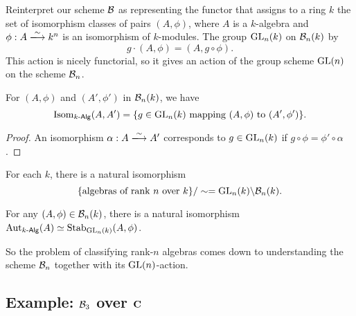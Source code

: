 Reinterpret our scheme $\mathcal{B}$ as representing the functor that assigns to a ring 
$k$ the set of isomorphism classes of pairs $(A,\phi)$, where $A$ is a 
$k$-algebra and $\phi:A\iso k^n$ is an isomorphism of $k$-modules. The group 
$\operatorname{GL}_n(k)$ on $\mathcal{B}_n(k)$ by 
\[
  g\cdot (A,\phi) = (A,g\circ \phi) .
\]
This action is nicely functorial, so it gives an action of the group scheme 
$\operatorname{GL}(n)$ on the scheme $\mathcal{B}_n$. 

\begin{prop}
For $(A,\phi)$ and $(A',\phi')$ in $\mathcal{B}_n(k)$, we have 
\[
  \operatorname{Isom}_{k\text{-}\mathsf{Alg}}(A,A') = \{g\in \operatorname{GL}_n(k)\text{ mapping }(A,\phi)\text{ to }(A',\phi')\} .
\]
\end{prop}
\begin{proof}
An isomorphism $\alpha:A\iso A'$ corresponds to $g\in \operatorname{GL}_n(k)$ if  
$g\circ\phi = \phi'\circ \alpha$. 
\end{proof}

\begin{coro}
For each $k$, there is a natural isomorphism 
\[
  \{\text{algebras of rank $n$ over $k$}\}/\sim = \operatorname{GL}_n(k)\backslash \mathcal{B}_n(k) . 
\]
\end{coro}

\begin{coro}
For any $(A,\phi)\in \mathcal{B}_n(k)$, there is a natural isomorphism 
$\operatorname{Aut}_{k\textnormal{-}\mathsf{Alg}}(A)\simeq \operatorname{Stab}_{\operatorname{GL}_n(k)}(A,\phi)$. 
\end{coro}

So the problem of classifying rank-$n$ algebras comes down to understanding the 
scheme $\mathcal{B}_n$ together with its $\operatorname{GL}(n)$-action. 





\subsection{Example: \texorpdfstring{$\mathcal{B}_3$}{B3} over \texorpdfstring{$\mathbf{C}$}{C}}


